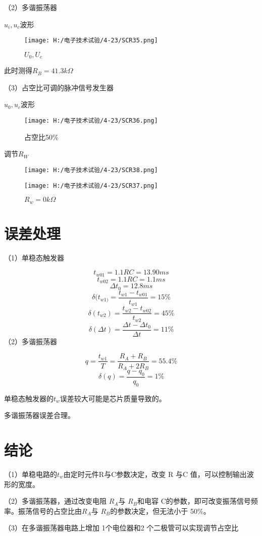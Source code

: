 \documentclass{article}
\begin{document}
\newpage
  （2）多谐振荡器\par
  $u_i,u_c$波形
  \begin{figure}[h]
        \centering   
        \texttt{[image: H:/电子技术试验/4-23/SCR35.png]}   
        \caption{$U_0,U_c$}   
        \label{fig:side:a}   
    \end{figure}
\par
此时测得$R_B=41.3k\Omega$
\par
（3）占空比可调的脉冲信号发生器\par
  $u_0,u_c$波形
  \begin{figure}[h]
        \centering   
        \texttt{[image: H:/电子技术试验/4-23/SCR36.png]}   
        \caption{占空比50\%}   
        \label{fig:side:a}   
    \end{figure}
\newpage
    调节$R_W$
    \begin{figure}[h]
        \begin{minipage}[t]{0.5\linewidth} %
          \centering   
          \texttt{[image: H:/电子技术试验/4-23/SCR38.png]}   
          \caption{$R_w=116.2k\Omega$}   
          \label{fig:side:a}   
        \end{minipage}%
        \begin{minipage}[t]{0.5\linewidth}   
          \centering   
          \texttt{[image: H:/电子技术试验/4-23/SCR37.png]}   
          \caption{$R_w=0k\Omega$}   
          \label{fig:side:b}   
        \end{minipage}   
      \end{figure}
 \section{ 误差处理}
（1）单稳态触发器\par 
\[ t_{w01}=1.1RC=13.90ms \]
\[ t_{w02}=1.1RC=1.1ms \]
\[ \Delta t_0=12.8ms \]
\[ \delta (t_{w1)}=\frac{ t_{w1}- t_{w01}}{t_{w1}}=15\%\]
\[ \delta (t_{w2})=\frac{ t_{w2}- t_{w02}}{t_{w2}}=45\%\]
\[ \delta (\Delta t)=\frac{ \Delta t- \Delta t_0}{\Delta t}=11\%\]
（2）多谐振荡器\par
\[q=\frac{t_{w1}}{T}=\frac{R_A+R_B}{R_A+2R_B}=55.4\%\]
\[\delta (q)=\frac{q-q_0}{q_0}=1\%\]

\par
单稳态触发器的$t_w$误差较大可能是芯片质量导致的。\par
多谐振荡器误差合理。\par
\section{结论}
（1）单稳电路的$t_w$由定时元件R与C参数决定，改变 R 与C 值，可以控制输出波形的宽度。\par
（2）多谐振荡器，通过改变电阻 $R_A$与 $R_B$和电容 C的参数，即可改变振荡信号频率。振荡信号的占空比由$R_A$与 $R_B$的参数决定，但无法小于 
50\%。\par
（3）在多谐振荡器电路上增加 1个电位器和2 个二极管可以实现调节占空比\par
\end{document}

